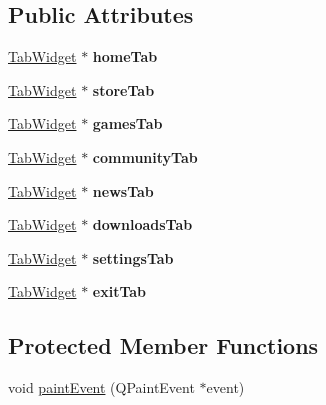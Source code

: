 \subsection*{Public Attributes}
\begin{DoxyCompactItemize}
\item 
\hypertarget{class_sidebar_ac23692f1eff7ee3f9358582f0f3665dd}{}\hyperlink{class_tab_widget}{Tab\+Widget} $\ast$ {\bfseries home\+Tab}\label{class_sidebar_ac23692f1eff7ee3f9358582f0f3665dd}

\item 
\hypertarget{class_sidebar_a509ca9f42ddb7b0caf907617bfc92757}{}\hyperlink{class_tab_widget}{Tab\+Widget} $\ast$ {\bfseries store\+Tab}\label{class_sidebar_a509ca9f42ddb7b0caf907617bfc92757}

\item 
\hypertarget{class_sidebar_a1e2a9ecf624dbb19a6d6a75b72ac42e6}{}\hyperlink{class_tab_widget}{Tab\+Widget} $\ast$ {\bfseries games\+Tab}\label{class_sidebar_a1e2a9ecf624dbb19a6d6a75b72ac42e6}

\item 
\hypertarget{class_sidebar_a8f3bf0a8f7ae8bc77bc83052fd86dd82}{}\hyperlink{class_tab_widget}{Tab\+Widget} $\ast$ {\bfseries community\+Tab}\label{class_sidebar_a8f3bf0a8f7ae8bc77bc83052fd86dd82}

\item 
\hypertarget{class_sidebar_ac29dd30190d2952e61791f15ff5cc820}{}\hyperlink{class_tab_widget}{Tab\+Widget} $\ast$ {\bfseries news\+Tab}\label{class_sidebar_ac29dd30190d2952e61791f15ff5cc820}

\item 
\hypertarget{class_sidebar_a53e12247f147cd692c8bcb8d59c75039}{}\hyperlink{class_tab_widget}{Tab\+Widget} $\ast$ {\bfseries downloads\+Tab}\label{class_sidebar_a53e12247f147cd692c8bcb8d59c75039}

\item 
\hypertarget{class_sidebar_aa2370f85a6da0d396f5abe020d74657c}{}\hyperlink{class_tab_widget}{Tab\+Widget} $\ast$ {\bfseries settings\+Tab}\label{class_sidebar_aa2370f85a6da0d396f5abe020d74657c}

\item 
\hypertarget{class_sidebar_a830826f30a3c24c501f2066232d25353}{}\hyperlink{class_tab_widget}{Tab\+Widget} $\ast$ {\bfseries exit\+Tab}\label{class_sidebar_a830826f30a3c24c501f2066232d25353}

\end{DoxyCompactItemize}
\subsection*{Protected Member Functions}
\begin{DoxyCompactItemize}
\item 
void \hyperlink{class_sidebar_a9da83e0abc2ba06f34359f9a1fa5a691}{paint\+Event} (Q\+Paint\+Event $\ast$event)
\end{DoxyCompactItemize}


